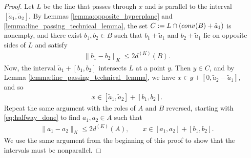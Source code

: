 \documentclass[10pt,a4paper]{amsart}
\begin{document}
\begin{proof}
    Let $L$ be the line that passes through $x$ and is parallel to the interval $[\tilde{a}_1,\tilde{a}_2]$. By Lemmas \ref{lemma:opposite_hyperplane} and \ref{lemma:line_passing_technical_lemma}, the set $C:=L\cap (\textup{conv}(B)+\tilde{a}_1)$ is nonempty, and there exist $b_1,b_2\in B$ such that $b_1+\tilde{a}_1$ and $b_2+\tilde{a}_1$ lie on opposite sides of $L$ and satisfy
    \begin{align*}
        \|b_1-b_2\|_K\leq 2d^{(K)}(B).
    \end{align*}
    Now, the interval $\tilde{a}_1+[b_1,b_2]$ intersects $L$ at a point $y$. Then $y\in C$, and by Lemma \ref{lemma:line_passing_technical_lemma}, we have $x\in y+[0,\tilde{a}_2-\tilde{a}_1]$, and so
    \begin{align}\label{eq:halfway_done}
        x\in [\tilde{a}_1,\tilde{a}_2]+[b_1,b_2].
    \end{align}
    Repeat the same argument with the roles of $A$ and $B$ reversed, starting with \eqref{eq:halfway_done} to find $a_1,a_2\in A$ such that
    \begin{align*}
        \|a_1-a_2\|_K\leq 2d^{(K)}(A),\qquad x\in [a_1,a_2]+[b_1,b_2].
    \end{align*}
    We use the same argument from the beginning of this proof to show that the intervals must be nonparallel.
\end{proof}
\end{document}
